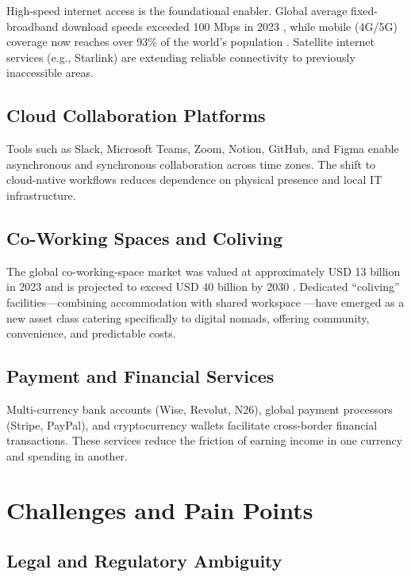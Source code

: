 \documentclass[12pt,a4paper]{article}
\begin{document}
High-speed internet access is the foundational enabler. Global average fixed-
broadband download speeds exceeded 100 Mbps in 2023
\citep{Ookla2023}, while mobile (4G/5G) coverage now reaches over 93\% of the
world's population \citep{GSMA2023}. Satellite internet services (e.g.,
Starlink) are extending reliable connectivity to previously inaccessible areas.

\subsection{Cloud Collaboration Platforms}

Tools such as Slack, Microsoft Teams, Zoom, Notion, GitHub, and Figma enable
asynchronous and synchronous collaboration across time zones. The shift to
cloud-native workflows reduces dependence on physical presence and local IT
infrastructure.

\subsection{Co-Working Spaces and Coliving}

The global co-working-space market was valued at approximately USD 13 billion
in 2023 and is projected to exceed USD 40 billion by 2030 \citep{GrandView2023}.
Dedicated ``coliving'' facilities—combining accommodation with shared workspace
—have emerged as a new asset class catering specifically to digital nomads,
offering community, convenience, and predictable costs.

\subsection{Payment and Financial Services}

Multi-currency bank accounts (Wise, Revolut, N26), global payment processors
(Stripe, PayPal), and cryptocurrency wallets facilitate cross-border financial
transactions. These services reduce the friction of earning income in one
currency and spending in another.

\section{Challenges and Pain Points}
\label{sec:challenges}

\subsection{Legal and Regulatory Ambiguity}
\end{document}
